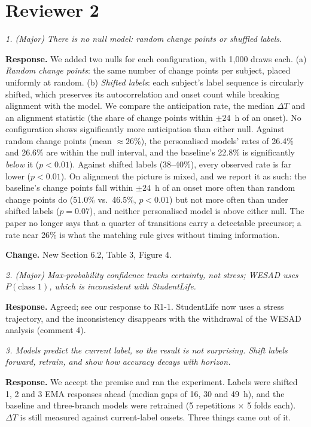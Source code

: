 \documentclass[11pt]{article}
\newenvironment{comment}{\par\medskip\noindent\begin{minipage}{\linewidth}\itshape\color{black!70}}{\end{minipage}\par\smallskip}
\newcommand{\dt}{$\Delta T$}
\newcommand{\resp}{\noindent\textbf{Response.} }
\newcommand{\change}{\par\noindent\textbf{Change.} }
\begin{document}
\section*{Reviewer 2}

\begin{comment}1. (Major) There is no null model: random change points or
shuffled labels.\end{comment}
\resp We added two nulls for each configuration, with 1{,}000 draws
each. (a) \emph{Random change points}: the same number of change points
per subject, placed uniformly at random. (b) \emph{Shifted labels}: each
subject's label sequence is circularly shifted, which preserves its
autocorrelation and onset count while breaking alignment with the model.
We compare the anticipation rate, the median \dt{} and an alignment
statistic (the share of change points within $\pm24$~h of an onset).
No configuration shows significantly more anticipation than either
null. Against random change points (mean $\approx 26$\%), the
personalised models' rates of 26.4\% and 26.6\% are within the null
interval, and the baseline's 22.8\% is significantly \emph{below} it
($p < 0.01$). Against shifted labels (38--40\%), every observed rate is
far lower ($p < 0.01$). On alignment the picture is mixed, and we report
it as such: the baseline's change points fall within $\pm 24$~h of an
onset more often than random change points do (51.0\% vs.\ 46.5\%,
$p < 0.01$) but not more often than under shifted labels ($p = 0.07$),
and neither personalised model is above either null. The paper no
longer says that a quarter of transitions carry a detectable precursor;
a rate near 26\% is what the matching rule gives without timing
information.
\change New Section 6.2, Table 3, Figure 4.

\begin{comment}2. (Major) Max-probability confidence tracks certainty, not
stress; WESAD uses $P(\text{class 1})$, which is inconsistent with
StudentLife.\end{comment}
\resp Agreed; see our response to R1-1. StudentLife now uses a stress
trajectory, and the inconsistency disappears with the withdrawal of the
WESAD analysis (comment 4).

\begin{comment}3. Models predict the current label, so the result is not
surprising. Shift labels forward, retrain, and show how accuracy decays
with horizon.\end{comment}
\resp We accept the premise and ran the experiment. Labels were shifted
1, 2 and 3 EMA responses ahead (median gaps of 16, 30 and 49~h), and
the baseline and three-branch models were retrained (5 repetitions
$\times$ 5 folds each). \dt{} is still measured against current-label
onsets. Three things came out of it.
\end{document}
